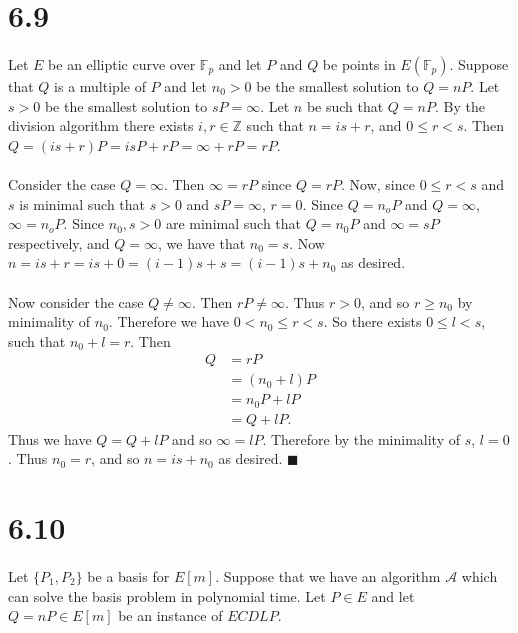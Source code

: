 \documentclass[letterpaper,12pt,oneside,onecolumn]{report}
\begin{document}
\section*{6.9}
\paragraph{}
Let $E$ be an elliptic curve over $\mathbb{F}_p$ and let $P$ and $Q$ be points in $E(\mathbb{F}_p)$. Suppose that $Q$ is a multiple of $P$ and let $n_0 > 0$ be the smallest solution to $Q = nP$. Let $s > 0$ be the smallest solution to $sP = \infty$. Let $n$ be such that $Q = nP$. By the division algorithm there exists $i, r \in \mathbb{Z}$ such that $n= is + r$, and $0 \leq r < s$. Then $Q = (is + r)P = isP + rP = \infty + rP = rP$.
\paragraph{}
Consider the case $Q = \infty$. Then $\infty = rP$ since $Q = rP$. Now, since $0 \leq r < s$ and $s$ is minimal such that $s>0$ and $sP = \infty$, $r = 0$. Since $Q = n_oP$ and $Q = \infty$, $\infty = n_oP$. Since $n_0, s > 0$ are minimal such that $Q = n_0P$ and $\infty = sP$ respectively, and $Q = \infty$, we have that $n_0 = s$. Now $n = is + r = is + 0 = (i-1)s + s = (i-1)s + n_0$ as desired.
\paragraph{}
Now consider the case $Q \neq \infty$. Then $rP \neq \infty$. Thus $r > 0$, and so $r \geq n_0$ by minimality of $n_0$. Therefore we have $0 < n_0 \leq r < s$. So there exists $0 \leq l < s$, such that $n_0 + l = r$. Then
\begin{align*}
Q &= rP \\
&= (n_0 + l)P \\
&= n_0P + lP \\
&= Q + lP.
\end{align*}
Thus we have $Q = Q + lP$ and so $\infty = lP$. Therefore by the minimality of $s$, $l = 0$. Thus $n_0 = r$, and so $n = is + n_0$ as desired. $\blacksquare$
\section*{6.10}
\paragraph{}
Let $\{P_1, P_2 \}$ be a basis for $E[m]$. Suppose that we have an algorithm $\mathcal{A}$ which can solve the basis problem in polynomial time. Let $P \in E$ and let $Q=nP \in E[m]$ be an instance of $ECDLP$.
\end{document}
